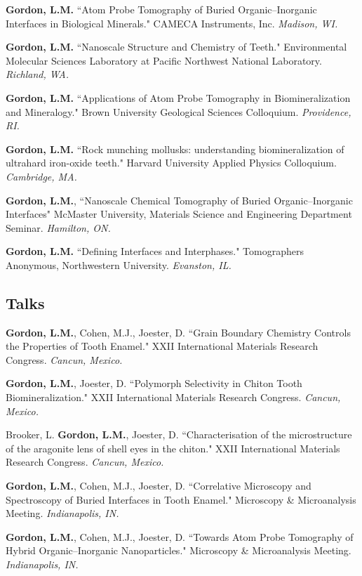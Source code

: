\textbf{Gordon, L.M.} ``Atom Probe Tomography of Buried Organic--Inorganic Interfaces in Biological Minerals." CAMECA Instruments, Inc. \emph{Madison, WI.}

\textbf{Gordon, L.M.} ``Nanoscale Structure and Chemistry of Teeth." Environmental Molecular Sciences Laboratory at Pacific Northwest National Laboratory. \emph{Richland, WA.}

\textbf{Gordon, L.M.} ``Applications of Atom Probe Tomography in Biomineralization and Mineralogy." Brown University Geological Sciences Colloquium. \emph{Providence, RI.}

\textbf{Gordon, L.M.} ``Rock munching mollusks: understanding biomineralization of ultrahard iron-oxide teeth." Harvard University Applied Physics Colloquium. \emph{Cambridge, MA.}

\textbf{Gordon, L.M.}, ``Nanoscale Chemical Tomography of Buried Organic--Inorganic Interfaces" McMaster University, Materials Science and Engineering Department Seminar. \emph{Hamilton, ON.}

\textbf{Gordon, L.M.} ``Defining Interfaces and Interphases." Tomographers Anonymous, Northwestern University. \emph{Evanston, IL.}

\subsection*{Talks}
\textbf{Gordon, L.M.}, Cohen, M.J., Joester, D. ``Grain Boundary Chemistry Controls the Properties of Tooth Enamel." XXII International Materials Research Congress. \emph{Cancun, Mexico.}
\begingroup\setlength{\parskip}{0.15cm}

\textbf{Gordon, L.M.}, Joester, D. ``Polymorph Selectivity in Chiton Tooth Biomineralization." XXII International Materials Research Congress. \emph{Cancun, Mexico.}

Brooker, L. \textbf{Gordon, L.M.}, Joester, D. ``Characterisation of the microstructure of the aragonite lens of shell eyes in the chiton." XXII International Materials Research Congress. \emph{Cancun, Mexico.}

\textbf{Gordon, L.M.}, Cohen, M.J., Joester, D. ``Correlative Microscopy and Spectroscopy of Buried Interfaces in Tooth Enamel." Microscopy \& Microanalysis Meeting. \emph{Indianapolis, IN.}

\textbf{Gordon, L.M.}, Cohen, M.J., Joester, D. ``Towards Atom Probe Tomography of Hybrid Organic--Inorganic Nanoparticles." Microscopy \& Microanalysis Meeting. \emph{Indianapolis, IN.}

